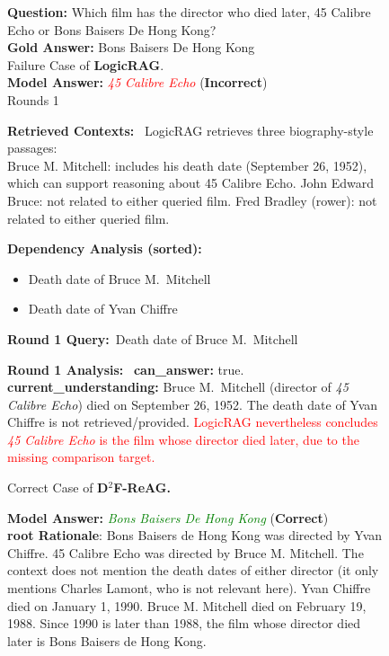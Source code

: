 \documentclass[11pt]{article}
\newcommand{\step}[2]{\textbf{#1:}~#2\par}
\begin{document}
\begin{figure}[h!]
\centering
\begin{minipage}{0.98\textwidth}
\begin{tcolorbox}[
  breakable,
  colback=white,
  colframe=black,
  boxrule=0.8pt,
  arc=1pt,
  left=6pt,right=6pt,top=6pt,bottom=6pt
]

\textbf{Question: }{Which film has the director who died later, {45 Calibre Echo} or {Bons Baisers De Hong Kong}?}\\
\textbf{Gold Answer: }{{Bons Baisers De Hong Kong}}\\
Failure Case of \textbf{LogicRAG}.\\
\textbf{Model Answer: }{\textcolor{red}{\textit{45 Calibre Echo}} \;(\textbf{Incorrect})}\\
{Rounds}{ 1}

\step{Retrieved Contexts}{
LogicRAG retrieves three biography-style passages:\\
Bruce M. Mitchell: includes his death date (September 26, 1952), which can support reasoning about 45 Calibre Echo.
John Edward Bruce: not related to either queried film.
Fred Bradley (rower): not related to either queried film.
}

\step{Dependency Analysis (sorted)}{
\begin{itemize}\setlength{\itemsep}{0pt}\setlength{\topsep}{2pt}
  \item Death date of Bruce M.~Mitchell
  \item Death date of Yvan Chiffre
\end{itemize}
}

\step{Round 1 Query}{Death date of Bruce M.~Mitchell}
\step{Round 1 Analysis}{
\textbf{can\_answer:} true.\;
\textbf{current\_understanding:}
Bruce M.~Mitchell (director of \textit{45 Calibre Echo}) died on September 26, 1952.
The death date of Yvan Chiffre is not retrieved/provided.
\textcolor{red}{LogicRAG nevertheless concludes \textit{45 Calibre Echo} is the film whose director died later, due to the missing comparison target.}
}

\vspace{6pt}
Correct Case of \textbf{D$^2$F-ReAG.}\par
\textbf{Model Answer: }{\textcolor{green}{\textit{Bons Baisers De Hong Kong}} (\textbf{Correct})}\\
\textbf{root Rationale}: Bons Baisers de Hong Kong was directed by Yvan Chiffre. 45 Calibre Echo was directed by Bruce M. Mitchell. The context does not mention the death dates of either director (it only mentions Charles Lamont, who is not relevant here). Yvan Chiffre died on January 1, 1990. Bruce M. Mitchell died on February 19, 1988. Since 1990 is later than 1988, the film whose director died later is Bons Baisers de Hong Kong.


\end{tcolorbox}
\end{minipage}
\end{figure}
\end{document}
